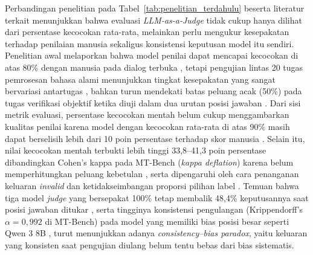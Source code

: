Perbandingan penelitian pada Tabel~\ref{tab:penelitian_terdahulu} beserta literatur terkait menunjukkan bahwa evaluasi \textit{LLM-as-a-Judge} tidak cukup hanya dilihat dari persentase kecocokan rata-rata, melainkan perlu mengukur kesepakatan terhadap penilaian manusia sekaligus konsistensi keputusan model itu sendiri. Penelitian awal melaporkan bahwa model penilai dapat mencapai kecocokan di atas 80\% dengan manusia pada dialog terbuka \cite{zhengJudgingLLMasaJudgeMTBench2023}, tetapi pengujian lintas 20 tugas pemrosesan bahasa alami menunjukkan tingkat kesepakatan yang sangat bervariasi antartugas \cite{bavarescoLLMsInsteadHuman2025}, bahkan turun mendekati batas peluang acak (50\%) pada tugas verifikasi objektif ketika diuji dalam dua urutan posisi jawaban \cite{tanJudgeBenchBenchmarkEvaluating2025}. Dari sisi metrik evaluasi, persentase kecocokan mentah belum cukup menggambarkan kualitas penilai karena model dengan kecocokan rata-rata di atas 90\% masih dapat berselisih lebih dari 10 poin persentase terhadap skor manusia \cite{thakurJudgingJudgesEvaluating2025}. Selain itu, nilai kecocokan mentah terbukti lebih tinggi 33,8--41,3 poin persentase dibandingkan Cohen's kappa pada MT-Bench (\textit{kappa deflation}) karena belum memperhitungkan peluang kebetulan \cite{normanReliabilityValiditySystematic2026}, serta dipengaruhi oleh cara penanganan keluaran \textit{invalid} dan ketidakseimbangan proporsi pilihan label \cite{raoAgreementMetricsLLMasJudge2026}. Temuan bahwa tiga model \textit{judge} yang bersepakat 100\% tetap membalik 48,4\% keputusannya saat posisi jawaban ditukar \cite{anghelDiagnosingBiasInstability2025}, serta tingginya konsistensi pengulangan (Krippendorff's $\alpha = 0,992$ di MT-Bench) pada model yang memiliki bias posisi besar seperti Qwen 3 8B \cite{normanReliabilityValiditySystematic2026}, turut menunjukkan adanya \textit{consistency--bias paradox}, yaitu keluaran yang konsisten saat pengujian diulang belum tentu bebas dari bias sistematis.

